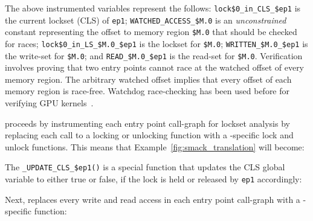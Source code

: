 The above instrumented variables represent the follows: \texttt{lock\$0\_in\_CLS\_\$ep1} is the current lockset (CLS) of \texttt{ep1}; \texttt{WATCHED\_ACCESS\_\$M.0} is an \emph{unconstrained} constant representing the offset to memory region \texttt{\$M.0} that should be checked for races; \texttt{lock\$0\_in\_LS\_\$M.0\_\$ep1} is the lockset for \texttt{\$M.0}; \texttt{WRITTEN\_\$M.0\_\$ep1} is the write-set for \texttt{\$M.0}; and \texttt{READ\_\$M.0\_\$ep1} is the read-set for \texttt{\$M.0}. Verification involves proving that two entry points cannot race at the watched offset of every memory region. The arbitrary watched offset implies that every offset of each memory region is race-free. Watchdog race-checking has been used before for verifying GPU kernels~\cite{bardsley2014engineering}.

\whoop proceeds by instrumenting each entry point call-graph for lockset analysis by replacing each call to a locking or unlocking function with a \whoop-specific lock and unlock functions. This means that Example~\ref{fig:smack_translation} will become:


The \texttt{\_UPDATE\_CLS\_\$ep1()} is a special function that updates the CLS global variable to either true or false, if the lock is held or released by \texttt{ep1} accordingly:


Next, \whoop replaces every write and read access in each entry point call-graph with a \whoop-specific function:

